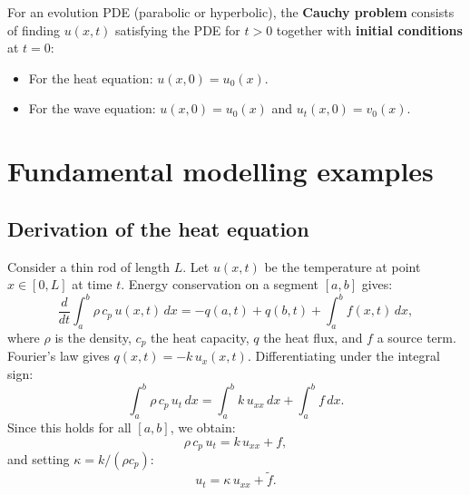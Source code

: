 \begin{definition}
For an evolution PDE (parabolic or hyperbolic), the \textbf{Cauchy problem}
consists of finding $u(x,t)$ satisfying the PDE for $t > 0$ together with
\textbf{initial conditions} at $t = 0$:
\begin{itemize}
    \item For the heat equation: $u(x,0) = u_0(x)$.
    \item For the wave equation: $u(x,0) = u_0(x)$ and $u_t(x,0) = v_0(x)$.
\end{itemize}
\end{definition}

\begin{center}
\end{center}

\section{Fundamental modelling examples}

\subsection{Derivation of the heat equation}

Consider a thin rod of length $L$. Let $u(x,t)$ be the temperature at
point $x \in [0,L]$ at time $t$. Energy conservation on a segment $[a,b]$
gives:
\[
    \frac{d}{dt}\int_a^b \rho\, c_p\, u(x,t)\,dx
    = -q(a,t) + q(b,t) + \int_a^b f(x,t)\,dx,
\]
where $\rho$ is the density, $c_p$ the heat capacity, $q$ the heat flux,
and $f$ a source term. Fourier's law gives $q(x,t) = -k\, u_x(x,t)$.
Differentiating under the integral sign:
\[
    \int_a^b \rho\, c_p\, u_t\, dx = \int_a^b k\, u_{xx}\, dx
    + \int_a^b f\, dx.
\]
Since this holds for all $[a,b]$, we obtain:
\[
    \rho\, c_p\, u_t = k\, u_{xx} + f,
\]
and setting $\kappa = k/(\rho c_p)$:
\begin{equation}\label{eq:heat_derivation}
    u_t = \kappa\, u_{xx} + \tilde{f}.
\end{equation}

